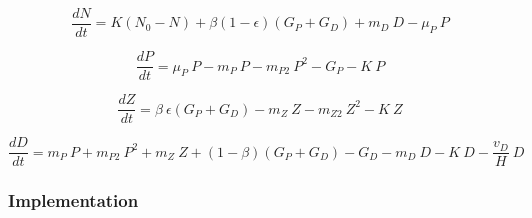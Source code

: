 \documentclass[journal abbreviation, manuscript]{copernicus}
\begin{document}
\begin{equation}
    \frac{d N}{d t} = 
    K (N_0 - N) %
    + \beta(1 - \epsilon)(G_P + G_D) %
    + m_D \ D %
    - \mu_{P} \ P %
\end{equation}

\begin{equation}
    \frac{d P}{d t} =
    \mu_{P} \ P  %
    - m_P \ P %
    - m_{P2} \ P^2 %
    - G_P %
    - K \ P %
\end{equation}

\begin{equation}
    \frac{d Z}{d t} =
    \beta \ \epsilon(G_P + G_D) %
    - m_Z \ Z %
    - m_{Z2} \ Z^2 %
    - K \ Z %
\end{equation}

\begin{equation}
    \frac{d D}{d t} = 
    m_P \ P %
    + m_{P2} \ P^2 %
    + m_Z \ Z %
    + (1 - \beta)(G_P + G_D) %
    - G_D %
    - m_D \ D %
    - K \ D %
    - \frac{v_D}{H} \ D %
\end{equation}


\subsubsection{Implementation}
\end{document}
